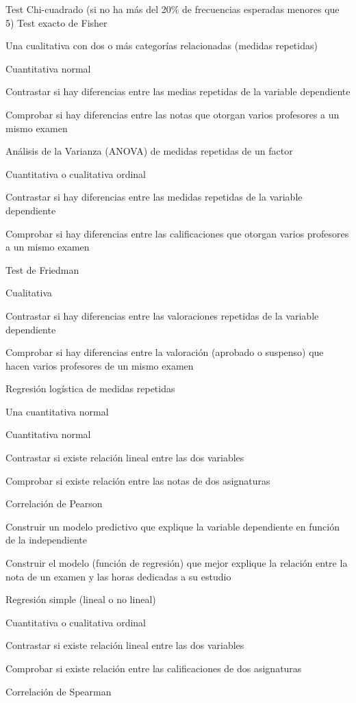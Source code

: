 \documentclass[
  a4paper,
]{scrreport}
\theoremstyle{definition}
\theoremstyle{definition}
\theoremstyle{remark}
\begin{document}
Test Chi-cuadrado (si no ha más del 20\% de frecuencias esperadas
menores que 5) Test exacto de Fisher

Una cualitativa con dos o más categorías relacionadas (medidas
repetidas)

Cuantitativa normal

Contrastar si hay diferencias entre las medias repetidas de la variable
dependiente

Comprobar si hay diferencias entre las notas que otorgan varios
profesores a un mismo examen

Análisis de la Varianza (ANOVA) de medidas repetidas de un factor

Cuantitativa o cualitativa ordinal

Contrastar si hay diferencias entre las medidas repetidas de la variable
dependiente

Comprobar si hay diferencias entre las calificaciones que otorgan varios
profesores a un mismo examen

Test de Friedman

Cualitativa

Contrastar si hay diferencias entre las valoraciones repetidas de la
variable dependiente

Comprobar si hay diferencias entre la valoración (aprobado o suspenso)
que hacen varios profesores de un mismo examen

Regresión logística de medidas repetidas

Una cuantitativa normal

Cuantitativa normal

Contrastar si existe relación lineal entre las dos variables

Comprobar si existe relación entre las notas de dos asignaturas

Correlación de Pearson

Construir un modelo predictivo que explique la variable dependiente en
función de la independiente

Construir el modelo (función de regresión) que mejor explique la
relación entre la nota de un examen y las horas dedicadas a su estudio

Regresión simple (lineal o no lineal)

Cuantitativa o cualitativa ordinal

Contrastar si existe relación lineal entre las dos variables

Comprobar si existe relación entre las calificaciones de dos asignaturas

Correlación de Spearman
\end{document}
